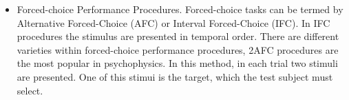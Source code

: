 \begin{itemize}
	\item Forced-choice Performance Procedures. Forced-choice tasks can be termed by Alternative Forced-Choice (AFC) or Interval Forced-Choice (IFC). In IFC procedures the stimulus are presented in temporal order. There are different varieties within forced-choice performance procedures, 2AFC procedures are the most popular in psychophysics. In this method, in each trial two stimuli are presented. One of this stimui is the target, which the test subject must select.
	
\end{itemize}

